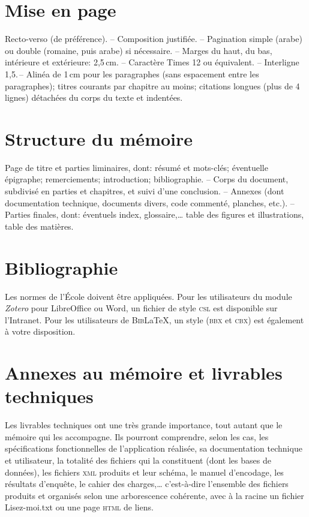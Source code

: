 \documentclass[a4paper,12pt]{book}
\begin{document}
\section{Mise en page}
Recto-verso (de préférence). -- Composition justifiée. -- Pagination simple (arabe) ou double (romaine, puis arabe) si nécessaire. -- Marges du haut, du bas, intérieure et extérieure: 2,5\,cm. -- Caractère Times 12 ou équivalent. -- Interligne 1,5.\,-- Alinéa de 1\,cm pour les paragraphes (sans espacement entre les paragraphes); titres courants par chapitre au moins; citations longues (plus de 4 lignes) détachées du corps du texte et indentées.

\section{Structure du mémoire}

Page de titre et parties liminaires, dont: résumé et mots-clés; éventuelle épigraphe; remerciements; introduction; bibliographie. -- Corps du document, subdivisé en parties et chapitres, et suivi d'une conclusion. -- Annexes (dont documentation technique, documents divers, code commenté, planches, etc.). -- Parties finales, dont: 
éventuels index, glossaire,\dots{}  table des figures et illustrations, table des matières.


\section{Bibliographie}
Les normes de l'École doivent être appliquées. %
Pour les utilisateurs du module \textit{Zotero} pour LibreOffice ou Word, un fichier de style \textsc{csl} est disponible sur l'Intranet. Pour les utilisateurs de \textsc{Bib}\LaTeX{}, un style (\textsc{bbx} et \textsc{cbx}) est également à votre disposition.

\section{Annexes au mémoire et livrables techniques}

Les livrables techniques ont une très grande importance, tout autant que le mémoire qui les accompagne. Ils pourront comprendre, selon les cas, 
 les spécifications fonctionnelles de l'application réalisée, sa documentation technique et utilisateur, la totalité des fichiers qui la constituent (dont les bases de données), les fichiers \textsc{xml} produits et leur schéma, le manuel d'encodage, les résultats d'enquête, le cahier des charges,\dots{} c'est-à-dire l'ensemble des fichiers produits et organisés selon une arborescence cohérente, avec à la racine un fichier \og Lisez-moi.txt\fg{} ou une page \textsc{html} de liens.
\end{document}
